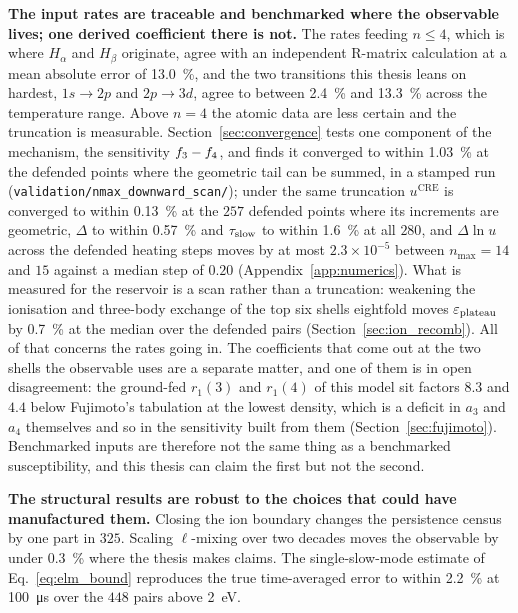 \textbf{The input rates are traceable and benchmarked where the observable
lives; one derived coefficient there is not.} The rates feeding $n \le 4$, which is where $H_\alpha$ and $H_\beta$
originate, agree with an independent R-matrix calculation at a mean absolute
error of \SI{13.0}{\percent}, and the two transitions this thesis leans on
hardest, $1s\to2p$ and $2p\to3d$, agree to between \SI{2.4}{\percent} and
\SI{13.3}{\percent} across the temperature range. Above $n=4$ the atomic data are
less certain and the truncation is measurable. Section~\ref{sec:convergence}
tests one component of the mechanism, the sensitivity $f_{3}-f_{4}$,
and finds it converged to within \SI{1.03}{\percent} at the defended points
where the geometric tail can be summed, in a stamped run
(\texttt{validation/nmax\_downward\_scan/}); under the same truncation
$u^{\mathrm{CRE}}$ is converged to within \SI{0.13}{\percent} at the $257$
defended points where its increments are geometric, $\Delta$ to within
\SI{0.57}{\percent} and $\tau_{\mathrm{slow}}$ to within \SI{1.6}{\percent} at all $280$,
and $\Delta\ln u$ across the defended heating steps moves by at most
$2.3\times10^{-5}$ between $n_{\max}=14$ and $15$ against a median step of
$0.20$ (Appendix~\ref{app:numerics}). What is measured
for the reservoir is a scan rather than a truncation: weakening the ionisation
and three-body exchange of the top six shells eightfold moves $\varepsilon_{\mathrm{plateau}}$ by
\SI{0.7}{\percent} at the median over the defended pairs
(Section~\ref{sec:ion_recomb}). All of that concerns the rates going in. The
coefficients that come out at the two shells the observable uses are a separate
matter, and one of them is in open disagreement: the ground-fed $r_1(3)$ and
$r_1(4)$ of this model sit factors $8.3$ and $4.4$ below Fujimoto's tabulation
at the lowest density, which is a deficit in $a_3$ and $a_4$ themselves and so
in the sensitivity built from them (Section~\ref{sec:fujimoto}). Benchmarked
inputs are therefore not the same thing as a benchmarked susceptibility, and
this thesis can claim the first but not the second.

\textbf{The structural results are robust to the choices that could have
manufactured them.} Closing the ion boundary changes the persistence census by
one part in $325$. Scaling $\ell$-mixing over two decades moves the observable
by under \SI{0.3}{\percent} where the thesis makes claims. The single-slow-mode
estimate of Eq.~\eqref{eq:elm_bound} reproduces the true time-averaged error to
within \SI{2.2}{\percent} at \SI{100}{\micro\second} over the $448$ pairs above
\SI{2}{\electronvolt}.

